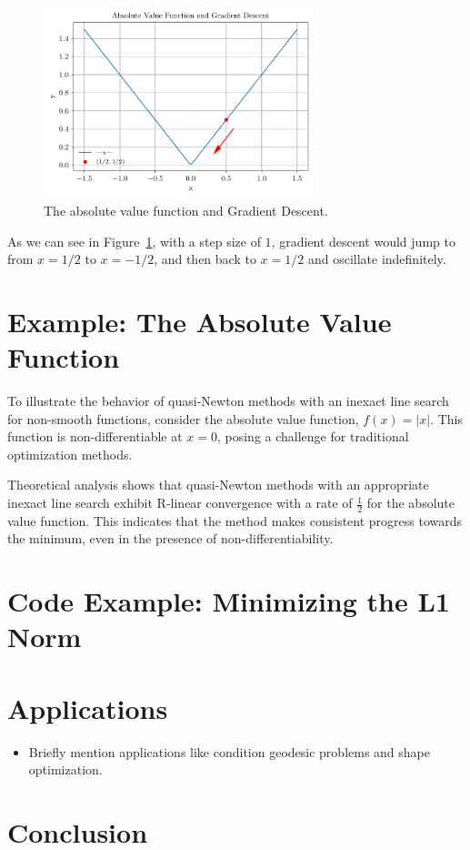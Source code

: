 \documentclass{article}
\begin{document}
\begin{figure}
    \centering
    \includegraphics[width=0.7\textwidth]{plots/abs_val_func.pdf}
    \caption{The absolute value function and Gradient Descent.}
    \label{fig:abs_value_function}
\end{figure}

As we can see in Figure~\ref{fig:abs_value_function}, with a step
size of $1$, gradient descent would jump to from $x=1/2$ to $x=-1/2$,
and then back to $x=1/2$ and oscillate indefinitely.

\section{Example: The Absolute Value Function}

To illustrate the behavior of
quasi-Newton methods with an inexact
line search for non-smooth functions,
consider the absolute value function,
$f(x) = |x|$. This function is
non-differentiable at $x = 0$, posing a
challenge for traditional optimization
methods.

Theoretical analysis shows that
quasi-Newton methods with an appropriate
inexact line search exhibit R-linear
convergence with a rate of
$\frac{1}{2}$ for the absolute value
function. This indicates that the
method makes consistent progress towards
the minimum, even in the presence of
non-differentiability.

\section{Code Example: Minimizing the L1 Norm}


\section{Applications}

\begin{itemize}
    \item Briefly mention applications like condition geodesic problems and
          shape optimization.
\end{itemize}

\section{Conclusion}

\end{document}
